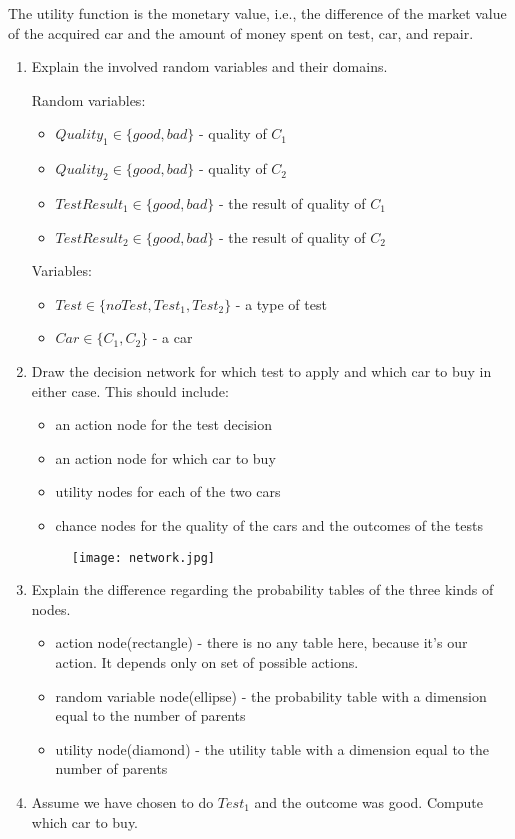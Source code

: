 \documentclass{homework}
\begin{document}
The utility function is the monetary value, i.e., the difference of the market value of the acquired car and the amount of money spent on test, car, and repair.
\begin{enumerate}
	\item Explain the involved random variables and their domains.
		
		Random variables:
		\begin{itemize}
			\item $Quality_1\in \{good, bad\}$ - quality of $C_1$
			\item $Quality_2\in \{good, bad\}$ - quality of $C_2$
			\item $TestResult_1\in \{good, bad\}$ - the result of quality of $C_1$
			\item $TestResult_2\in \{good, bad\}$ - the result of quality of $C_2$
		\end{itemize}

		Variables:
		\begin{itemize}
			\item $Test\in \{noTest, Test_1, Test_2\}$ - a type of test
			\item $Car\in \{C_1, C_2\}$ - a car
		\end{itemize}
	\item Draw the decision network for which test to apply and which car to buy in either case. This should include:
		\begin{itemize}
			\item an action node for the test decision
			\item an action node for which car to buy
			\item utility nodes for each of the two cars
			\item chance nodes for the quality of the cars and the outcomes of the tests
		\end{itemize}
	\begin{figure}[hbt!]
		\centering
		\texttt{[image: network.jpg]}
	\end{figure}
	\item Explain the difference regarding the probability tables of the three kinds of nodes.
	\begin{itemize}
		\item action node(rectangle) - there is no any table here, because it's our action. It depends only on set of possible actions.
		\item random variable node(ellipse) - the probability table with a dimension equal to the number of parents
		\item utility node(diamond) - the utility table with a dimension equal to the number of parents
	\end{itemize}
	\item Assume we have chosen to do $Test_1$ and the outcome was good. Compute which car to buy.


\end{enumerate}
\end{document}
